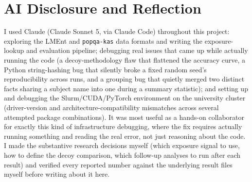 \documentclass[11pt]{article}
\begin{document}
\section*{AI Disclosure and Reflection}
I used Claude (Claude Sonnet 5, via Claude Code) throughout this project: exploring the LMEnt and \texttt{popqa-kas} data formats and writing the exposure-lookup and evaluation pipeline; debugging real issues that came up while actually running the code (a decoy-methodology flaw that flattened the accuracy curve, a Python string-hashing bug that silently broke a fixed random seed's reproducibility across runs, and a grouping bug that quietly merged two distinct facts sharing a subject name into one during a summary statistic); and setting up and debugging the Slurm/CUDA/PyTorch environment on the university cluster (driver-version and architecture-compatibility mismatches across several attempted package combinations). It was most useful as a hands-on collaborator for exactly this kind of infrastructure debugging, where the fix requires actually running something and reading the real error, not just reasoning about the code. I made the substantive research decisions myself (which exposure signal to use, how to define the decoy comparison, which follow-up analyses to run after each result) and verified every reported number against the underlying result files myself before writing about it here.



\end{document}
